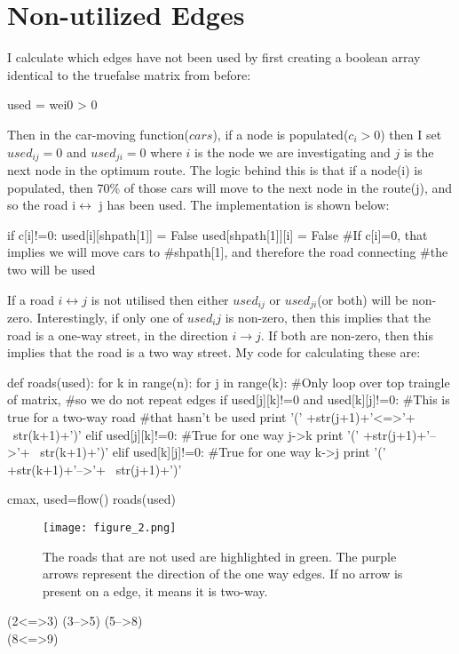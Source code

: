 \documentclass[paper=a4, fontsize=12pt]{scrartcl} %
\numberwithin{equation}{section}       %
\numberwithin{figure}{section}         %
\numberwithin{table}{section}          %
\begin{document}
\section{Non-utilized Edges}
I calculate which edges have not been used by first creating a boolean array identical to the truefalse matrix from before:
\begin{python}
	used = wei0 > 0
\end{python}
Then in the car-moving function($cars$), if a node is populated($c_i >0$) then I set $used_{ij}=0$ and $used_{ji}=0$ where $i$ is the node we are investigating and $j$ is the next node in the optimum route. 
The logic behind this is that if a node(i) is populated, then 70\% of those cars will move to the next node in the route(j), and so the road i$\leftrightarrow$ j has been used. The implementation is shown below:
\begin{python}
	if c[i]!=0:
		used[i][shpath[1]] = False
		used[shpath[1]][i] = False
	#If c[i]=0, that implies we will move cars to 
	#shpath[1], and therefore the road connecting 
	#the two will be used
\end{python}
If a road $i\leftrightarrow j$ is not utilised then either $used_{ij}$ or $used_{ji}$(or both) will be non-zero. Interestingly, if only one of $used_ij$ is non-zero, then this implies that the road is a one-way street, in the direction $i\rightarrow j$. If both are non-zero, then this implies that the road is a two way street. 
My code for calculating these are:
\begin{python}
def roads(used):
	for k in range(n):
		for j in range(k):
		#Only loop over top traingle of matrix,
		#so we do not repeat edges
			if used[j][k]!=0 and used[k][j]!=0:
			#This is true for a two-way road 
			#that hasn't be used
				print '(' +str(j+1)+'<=>'+ \
				 str(k+1)+')'
			elif used[j][k]!=0:
			#True for one way j->k
				print '(' +str(j+1)+'-->'+ \
				 str(k+1)+')'
			elif used[k][j]!=0:
			#True for one way k->j
				print '(' +str(k+1)+'-->'+ \
				 str(j+1)+')'

cmax, used=flow()
roads(used) 
\end{python}
\begin{figure}[H]
	\centering
	\texttt{[image: figure\_2.png]}
	\caption{The roads that are not used are highlighted in green. The purple arrows represent the direction of the one way edges. If no arrow is present on a edge, it means it is two-way.}
	\label{fig:myfigure2}
\end{figure}
(2<=>3)
(3-->5)
(5-->8)
\\(8<=>9)
\end{document}
